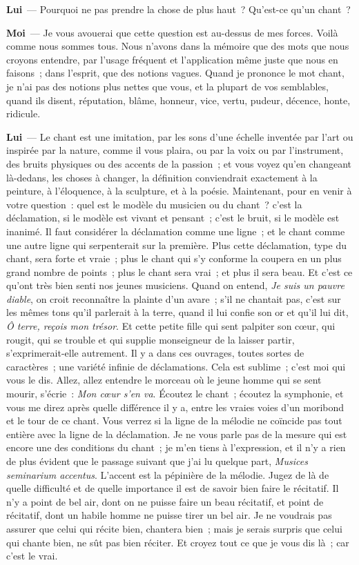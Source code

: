 \documentclass[french,twoside]{book} %
\newcommand{\labelchar}[1]{\textbf{\color{rubric} #1}}
\begin{document}
\labelchar{Lui} — Pourquoi ne pas prendre la chose de plus haut ? Qu’est-ce qu’un chant ?\par
\labelchar{Moi} — Je vous avouerai que cette question est au-dessus de mes forces. Voilà comme nous sommes tous. Nous n’avons dans la mémoire que des mots que nous croyons entendre, par l’usage fréquent et l’application même juste que nous en faisons ; dans l’esprit, que des notions vagues. Quand je prononce le mot chant, je n’ai pas des notions plus nettes que vous, et la plupart de vos semblables, quand ils disent, réputation, blâme, honneur, vice, vertu, pudeur, décence, honte, ridicule.\par
\labelchar{Lui} — Le chant est une imitation, par les sons d’une échelle inventée par l’art ou inspirée par la nature, comme il vous plaira, ou par la voix ou par l’instrument, des bruits physiques ou des accents de la passion ; et vous voyez qu’en changeant là-dedans, les choses à changer, la définition conviendrait exactement à la peinture, à l’éloquence, à la sculpture, et à la poésie. Maintenant, pour en venir à votre question : quel est le modèle du musicien ou du chant ? c’est la déclamation, si le modèle est vivant et pensant ; c’est le bruit, si le modèle est inanimé. Il faut considérer la déclamation comme une ligne ; et le chant comme une autre ligne qui serpenterait sur la première. Plus cette déclamation, type du chant, sera forte et vraie ; plus le chant qui s’y conforme la coupera en un plus grand nombre de points ; plus le chant sera vrai ; et plus il sera beau. Et c’est ce qu’ont très bien senti nos jeunes musiciens. Quand on entend, \emph{Je suis un pauvre diable}, on croit reconnaître la plainte d’un avare ; s’il ne chantait pas, c’est sur les mêmes tons qu’il parlerait à la terre, quand il lui confie son or et qu’il lui dit, \emph{Ô terre, reçois mon trésor}. Et cette petite fille qui sent palpiter son cœur, qui rougit, qui se trouble et qui supplie monseigneur de la laisser partir, s’exprimerait-elle autrement. Il y a dans ces ouvrages, toutes sortes de caractères ; une variété infinie de déclamations. Cela est sublime ; c’est moi qui vous le dis. Allez, allez entendre le morceau où le jeune homme qui se sent mourir, s’écrie : \emph{Mon cœur s’en va}. Écoutez le chant ; écoutez la symphonie, et vous me direz après quelle différence il y a, entre les vraies voies d’un moribond et le tour de ce chant. Vous verrez si la ligne de la mélodie ne coïncide pas tout entière avec la ligne de la déclamation. Je ne vous parle pas de la mesure qui est encore une des conditions du chant ; je m’en tiens à l’expression, et il n’y a rien de plus évident que le passage suivant que j’ai lu quelque part, \emph{Musices seminarium accentus}. L’accent est la pépinière de la mélodie. Jugez de là de quelle difficulté et de quelle importance il est de savoir bien faire le récitatif. Il n’y a point de bel air, dont on ne puisse faire un beau récitatif, et point de récitatif, dont un habile homme ne puisse tirer un bel air. Je ne voudrais pas assurer que celui qui récite bien, chantera bien ; mais je serais surpris que celui qui chante bien, ne sût pas bien réciter. Et croyez tout ce que je vous dis là ; car c’est le vrai.\par
\end{document}
